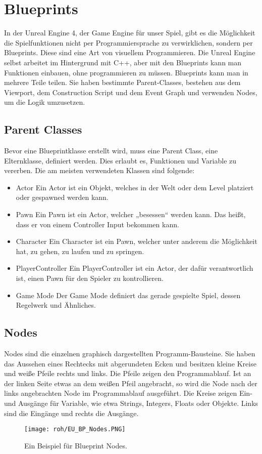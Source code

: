\section{Blueprints}
In der Unreal Engine 4, der Game Engine für unser Spiel, gibt es die Möglichkeit die Spielfunktionen nicht per Programmiersprache zu verwirklichen, sondern per Blueprints.
Diese sind eine Art von visuellem Programmieren. \citep{ue:BPs}
Die Unreal Engine selbst arbeitet im Hintergrund mit C++, aber mit den Blueprints kann man Funktionen einbauen, ohne programmieren zu müssen. \citep{ue:programming}
Blueprints kann man in mehrere Teile teilen.
Sie haben bestimmte Parent-Classes, bestehen aus dem Viewport, dem Construction Script und dem Event Graph und verwenden Nodes, um die Logik umzusetzen. \citep{ue:BPoverview}
\subsection{Parent Classes} \citep{ue:BPParents}
Bevor eine Blueprintklasse erstellt wird, muss eine Parent Class, eine Elternklasse, definiert werden.
Dies erlaubt es, Funktionen und Variable zu vererben.
Die am meisten verwendeten Klassen sind folgende:
\begin{itemize}
    \item Actor \citep{ue:BPActors}
    Ein Actor ist ein Objekt, welches in der Welt oder dem Level platziert oder gespawned werden kann.
    \item Pawn \citep{ue:BPPawn}
    Ein Pawn ist ein Actor, welcher „besessen“ werden kann.
    Das heißt, dass er von einem Controller Input bekommen kann.
    \item Character \citep{ue:BPCharacter}
    Ein Character ist ein Pawn, welcher unter anderem die Möglichkeit hat, zu gehen, zu laufen und zu springen.
    \item PlayerController \citep{ue:BPPlayerController}
    Ein PlayerController ist ein Actor, der dafür verantwortlich ist, einen Pawn für den Spieler zu kontrollieren.
    \item Game Mode \citep{ue:BPGameMode}
    Der Game Mode definiert das gerade gespielte Spiel, dessen Regelwerk und Ähnliches.
\end{itemize}
\subsection{Nodes} \citep{ue:node_introduction}
Nodes sind die einzelnen graphisch dargestellten Programm-Bausteine.
Sie haben das Aussehen eines Rechtecks mit abgerundeten Ecken und besitzen kleine Kreise und weiße Pfeile rechts und links.
Die Pfeile zeigen den Programmablauf.
Ist an der linken Seite etwas an dem weißen Pfeil angebracht, so wird die Node nach der links angebrachten Node im Programmablauf ausgeführt.
Die Kreise zeigen Ein- und Ausgänge für Variable, wie etwa Strings, Integers, Floats oder Objekte.
Links sind die Eingänge und rechts die Ausgänge.
\raggedbottom
\begin{figure}[H]
    \centering
    \texttt{[image: roh/EU\_BP\_Nodes.PNG]}
    \caption{Ein Beispiel für Blueprint Nodes.}
    \label{UE:BP_Nodes}
\end{figure}
